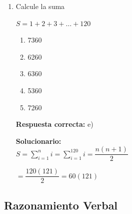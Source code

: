 \begin{enumerate}
	\vspace{2mm}
	\textbf{Solucionario:}\\
	
	\textit{i)} $2\%4=2+2(4)+4=14$
	
	\textit{ii)} $3\Delta2=3^2+3(2)-2^2=11$
	
	\textit{iii)} $14\%11=14+14(11)+11=14+154+11$
	
	
	\vspace{6mm}
	
	\item Calcule la suma
	
	$S=1+2+3+\ldots+120$
	
	\begin{enumerate}[label=\alph*)]
		\item 7360
		\item 6260
		\item 6360
		\item 5360
		\item 7260
	\end{enumerate}
	\textbf{Respuesta correcta:} e)
	
	\vspace{2mm}
	\textbf{Solucionario:}\\
	
	$S=\sum_{i=1}^{n} i=\sum_{i=1}^{120} i=\dfrac{n(n+1)}{2}$
	
	$=\dfrac{120(121)}{2}=60(121)$
	
	
	\vspace{6mm}
	
\end{enumerate}



\subsection*{Razonamiento Verbal}

